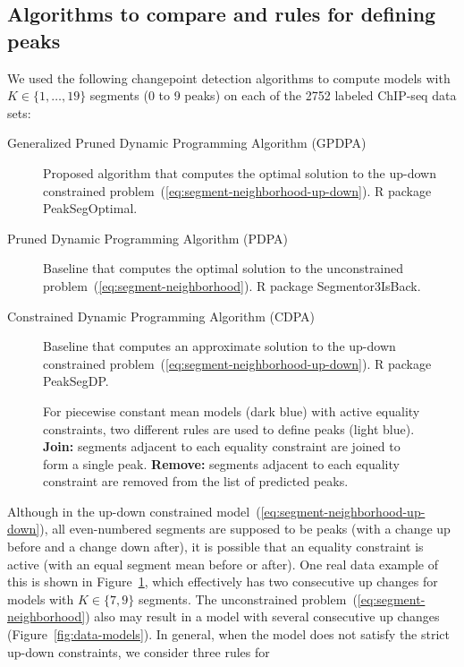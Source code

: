 \documentclass[twoside,11pt]{article}
\begin{document}
\subsection{Algorithms to compare and rules for defining peaks}
\label{sec:algos-rules}
We used the following changepoint detection algorithms to compute
models with $K\in\{1,\dots,19\}$ segments (0 to 9 peaks) on each of
the 2752 labeled ChIP-seq data sets:
\begin{description}
\item[Generalized Pruned Dynamic Programming Algorithm (GPDPA)]
  Proposed algorithm that computes the optimal solution to the up-down
  constrained problem~(\ref{eq:segment-neighborhood-up-down}). R
  package PeakSegOptimal. 
\item[Pruned Dynamic Programming Algorithm (PDPA)] Baseline that
  computes the optimal solution to the unconstrained
  problem~(\ref{eq:segment-neighborhood}). R package Segmentor3IsBack.
\item[Constrained Dynamic Programming Algorithm (CDPA)] Baseline that
  computes an approximate solution to the up-down constrained
  problem~(\ref{eq:segment-neighborhood-up-down}). R package PeakSegDP.
\end{description}
\begin{figure} 
  \centering
  
  \vspace{-1cm} 
  \caption{For piecewise constant mean models (dark blue) with
    active equality constraints, two different rules are used to define
    peaks (light blue). \textbf{Join:} segments adjacent to each equality
    constraint are joined to form a single peak. \textbf{Remove:}
    segments adjacent to each equality constraint are removed from the
    list of predicted peaks. }
  \label{fig:infeasible-error}
\end{figure}
Although in the up-down constrained
model~(\ref{eq:segment-neighborhood-up-down}), all even-numbered
segments are supposed to be peaks (with a change up before and a
change down after), it is possible that an equality constraint is
active (with an equal segment mean before or after). One real data
example of this is shown in Figure~\ref{fig:infeasible-error}, which
effectively has two consecutive up changes for models with
$K\in\{7,9\}$ segments. The unconstrained
problem~(\ref{eq:segment-neighborhood}) also may result in a model
with several consecutive up changes (Figure~\ref{fig:data-models}). In general, when the model does
not satisfy the strict up-down constraints, we consider three rules for
\end{document}
